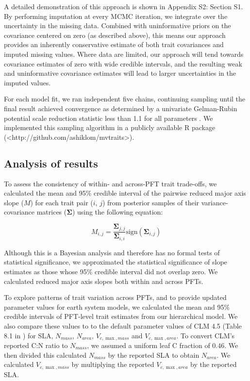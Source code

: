 \documentclass{article}
\begin{document}
A detailed demonstration of this approach is shown in Appendix S2: Section S1.
By performing imputation at every MCMC iteration, we integrate over the uncertainty in the missing data.
Combined with uninformative priors on the covariance centered on zero (as described above),
this means our approach provides an inherently conservative estimate of both trait covariances and imputed missing values.
Where data are limited, our approach will tend towards covariance estimates of zero with wide credible intervals,
and the resulting weak and uninformative covariance estimates will lead to larger uncertainties in the imputed values.

For each model fit, we ran independent five chains, continuing sampling until the final result achieved convergence as determined by a univariate Gelman-Rubin potential scale reduction statistic less than 1.1 for all parameters \citep{gelman_1992_inference}.
We implemented this sampling algorithm in a publicly available R \citep{team_2018_r} package (<http://github.com/ashiklom/mvtraits>).

\subsection{Analysis of results}

To assess the consistency of within- and across-PFT trait trade-offs,
we calculated the mean and 95\% credible interval of the pairwise reduced major axis slope ($M$) for each trait pair ($i$, $j$)
from posterior samples of their variance-covariance matrices ($\bm{\Sigma}$) using the following equation:

\begin{equation}
M_{i,j} = \frac{\bm{\Sigma}_{j,j}}{\bm{\Sigma}_{i,i}} \textrm{sign}(\bm{\Sigma}_{i,j})
\end{equation}

Although this is a Bayesian analysis and therefore has no formal tests of statistical significance,
we approximated the statistical significance of slope estimates as those whose 95\% credible interval did not overlap zero.
We calculated reduced major axis slopes both within and across PFTs.

To explore patterns of trait variation across PFTs,
and to provide updated parameter values for earth system models,
we calculated the mean and 95\% credible intervals of PFT-level trait estimates from our hierarchical model.
We also compare these values to to the default parameter values of CLM 4.5 (Table 8.1 in \citealt{clm45_note}) for SLA, $N_{mass}$, $N_{area}$, $V_{c,\max,mass}$ and $V_{c,\max,area}$.
To convert CLM's reported C:N ratio to $N_{mass}$, we assumed a uniform leaf C fraction of 0.46.
We then divided this calculated $N_{mass}$ by the reported SLA to obtain $N_{area}$.
We calculated $V_{c,\max,mass}$ by multiplying the reported $V_{c,\max,area}$ by the reported SLA.
\end{document}

